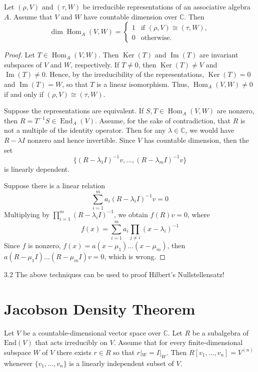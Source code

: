 \documentclass[12pt]{article}
\newenvironment{theorem}[2][Theorem]{\begin{trivlist}
\item[\hskip \labelsep {\bfseries #1}\hskip \labelsep {\bfseries #2.}]}{\end{trivlist}}
\newenvironment{lemma}[2][Lemma]{\begin{trivlist}
\item[\hskip \labelsep {\bfseries #1}\hskip \labelsep {\bfseries #2.}]}{\end{trivlist}}
\begin{document}
\begin{lemma}{3.1}
    Let $(\rho, V)$ and $(\tau, W)$ be irreducible representations of an associative algebra $A$. Assume that $V$ and $W$ have countable dimension over $\mathbb{C}$. Then
\[
\dim \operatorname{Hom}_A(V, W) = 
\begin{cases}
1 & \text{if } (\rho, V) \cong (\tau, W), \\
0 & \text{otherwise}.
\end{cases}
\]
\end{lemma}
\begin{proof}
    Let \( T \in \operatorname{Hom}_A(V, W) \). Then \( \operatorname{Ker}(T) \) and \( \operatorname{Im}(T) \) are invariant subspaces of \( V \) and \( W \), respectively. If \( T \neq 0 \), then \( \operatorname{Ker}(T) \neq V \) and \( \operatorname{Im}(T) \neq 0 \). Hence, by the irreducibility of the representations, \( \operatorname{Ker}(T) = 0 \) and \( \operatorname{Im}(T) = W \), so that \( T \) is a linear isomorphism. Thus, \( \operatorname{Hom}_A(V, W) \neq 0 \) if and only if \( (\rho, V) \cong (\tau, W) \).

    Suppose the representations are equivalent. If \( S, T \in \operatorname{Hom}_A(V, W) \) are nonzero, then \( R = T^{-1}S \in \operatorname{End}_A(V) \). Assume, for the sake of contradiction, that \( R \) is not a multiple of the identity operator. Then for any \( \lambda \in \mathbb{C} \), we would have \( R - \lambda I \) nonzero and hence invertible. Since $V$ has countable dimension, then  the set$$\{(R-\lambda_1 I)^{-1}v,...,(R-\lambda_m I)^{-1}v\}$$ is linearly dependent. 
    
    Suppose there is a linear relation$$\sum_{i=1}^m a_i(R-\lambda_i I)^{-1}v=0$$ Multiplying by $\prod_{i=1}^m(R-\lambda_i I)^{-1}$, we obtain $f(R)v = 0$, where$$f(x)= \sum_{i=1}^ma_i\prod_{j\neq i}(x-\lambda_i)^{-1}$$Since $f$ is nonzero, $f(x) = a(x-\mu_1)...(x-\mu_m)$, then $a(R-\mu_1 I)...(R-\mu_m I)v = 0$, which is wrong.
\end{proof}

\begin{rmk}{3.2}
    The above techniques can be used to proof Hilbert's Nullstellensatz!
\end{rmk}

\section{Jacobson Density Theorem}

\begin{theorem}{4.1}
    Let \( V \) be a countable-dimensional vector space over \( \mathbb{C} \). Let \( R \)
    be a subalgebra of \( \text{End}(V) \) that acts irreducibly on \( V \). Assume that for every finite-dimensional subspace \( W \) of \( V \) there exists \( r \in R \) so that \( r|_W = I|_W \). Then
    \( R[v_1, \ldots, v_n] = V^{(n)} \) whenever \( \{v_1, \ldots, v_n\} \) is a linearly independent subset of \( V \).
\end{theorem}
\end{document}

